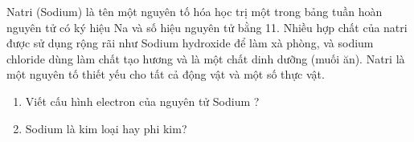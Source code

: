 \documentclass[Main.tex]{subfiles}
\begin{document}
	\begin{bt}
		Natri (Sodium) là tên một nguyên tố hóa học trị một trong bảng tuần hoàn nguyên tử có ký hiệu Na và số hiệu nguyên tử bằng 11. Nhiều hợp chất của natri được sử dụng rộng rãi như Sodium hydroxide để làm xà phòng, và sodium chloride dùng làm chất tạo hương và là một chất dinh dưỡng (muối ăn). Natri là một nguyên tố thiết yếu cho tất cả động vật và một số thực vật.
		\begin{enumerate}
			\item Viết cấu hình electron của nguyên tử Sodium ?
			\item Sodium là kim loại hay phi kim?
		\end{enumerate}
	\end{bt}
\end{document}
